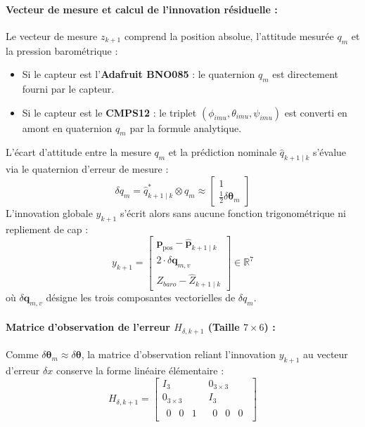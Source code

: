 \documentclass[../Formulations_Kalman.tex]{subfiles}
\begin{document}
\paragraph{Vecteur de mesure et calcul de l'innovation résiduelle :}
Le vecteur de mesure $z_{k+1}$ comprend la position absolue, l'attitude mesurée $q_m$ et la pression barométrique :
\begin{itemize}
    \item Si le capteur est l'\textbf{Adafruit BNO085} : le quaternion $q_m$ est directement fourni par le capteur.
    \item Si le capteur est le \textbf{CMPS12} : le triplet $(\phi_{imu}, \theta_{imu}, \psi_{imu})$ est converti en amont en quaternion $q_m$ par la formule analytique.
\end{itemize}
L'écart d'attitude entre la mesure $q_m$ et la prédiction nominale $\hat{q}_{k+1\mid k}$ s'évalue via le quaternion d'erreur de mesure :
\begin{equation}
\delta q_m = \hat{q}_{k+1\mid k}^* \otimes q_m \approx \begin{bmatrix} 1 \\ \frac{1}{2} \delta\boldsymbol{\theta}_m \end{bmatrix}
\end{equation}
L'innovation globale $y_{k+1}$ s'écrit alors sans aucune fonction trigonométrique ni repliement de cap :
\begin{equation}
y_{k+1} = \begin{bmatrix}
\mathbf{p}_{\text{pos}} - \hat{\mathbf{p}}_{k+1\mid k} \\
2 \cdot \delta\mathbf{q}_{m, v} \\
Z_{baro} - \hat{Z}_{k+1\mid k}
\end{bmatrix} \in \mathbb{R}^7
\end{equation}
où $\delta\mathbf{q}_{m, v}$ désigne les trois composantes vectorielles de $\delta q_m$.

\paragraph{Matrice d'observation de l'erreur $H_{\delta, k+1}$ (Taille $7 \times 6$) :}
Comme $\delta\boldsymbol{\theta}_m \approx \delta\boldsymbol{\theta}$, la matrice d'observation reliant l'innovation $y_{k+1}$ au vecteur d'erreur $\delta x$ conserve la forme linéaire élémentaire :
\begin{equation}
H_{\delta, k+1} = \begin{bmatrix}
I_3 & 0_{3\times3} \\
0_{3\times3} & I_3 \\
\begin{matrix} 0 & 0 & 1 \end{matrix} & \begin{matrix} 0 & 0 & 0 \end{matrix}
\end{bmatrix}
\end{equation}
\end{document}
